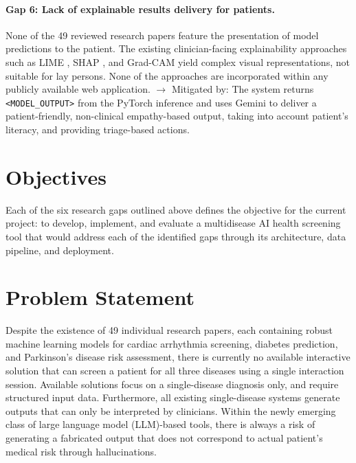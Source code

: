 \paragraph{Gap 6: Lack of explainable results delivery for patients.}
None of the 49 reviewed research papers feature the presentation of model predictions to the patient. The existing clinician-facing explainability approaches such as LIME \cite{kavitha2024}, SHAP \cite{elgendy2025}, and Grad-CAM \cite{liu2024} yield complex visual representations, not suitable for lay persons. None of the approaches are incorporated within any publicly available web application.
$\rightarrow$ Mitigated by: The system returns \texttt{<MODEL\_OUTPUT>} from the PyTorch inference and uses Gemini to deliver a patient-friendly, non-clinical empathy-based output, taking into account patient's literacy, and providing triage-based actions.

\section{Objectives}

Each of the six research gaps outlined above defines the objective for the current project: to develop, implement, and evaluate a multidisease AI health screening tool that would address each of the identified gaps through its architecture, data pipeline, and deployment.

\section{Problem Statement}

Despite the existence of 49 individual research papers, each containing robust machine learning models for cardiac arrhythmia screening, diabetes prediction, and Parkinson's disease risk assessment, there is currently no available interactive solution that can screen a patient for all three diseases using a single interaction session. Available solutions focus on a single-disease diagnosis only, and require structured input data. Furthermore, all existing single-disease systems generate outputs that can only be interpreted by clinicians. Within the newly emerging class of large language model (LLM)-based tools, there is always a risk of generating a fabricated output that does not correspond to actual patient's medical risk through hallucinations.

